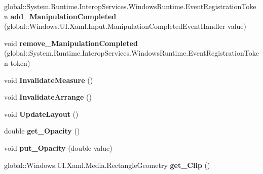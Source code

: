 \begin{DoxyCompactItemize}
global\+::\+System.\+Runtime.\+Interop\+Services.\+Windows\+Runtime.\+Event\+Registration\+Token {\bfseries add\+\_\+\+Manipulation\+Completed} (global\+::\+Windows.\+U\+I.\+Xaml.\+Input.\+Manipulation\+Completed\+Event\+Handler value)
\item 
\mbox{\label{interface_windows_1_1_u_i_1_1_xaml_1_1_i_u_i_element_a2e0443d9216898f5abc1ba06ac3d0404}} 
void {\bfseries remove\+\_\+\+Manipulation\+Completed} (global\+::\+System.\+Runtime.\+Interop\+Services.\+Windows\+Runtime.\+Event\+Registration\+Token token)
\item 
\mbox{\label{interface_windows_1_1_u_i_1_1_xaml_1_1_i_u_i_element_aac9b9aec43687960735502a35820466d}} 
void {\bfseries Invalidate\+Measure} ()
\item 
\mbox{\label{interface_windows_1_1_u_i_1_1_xaml_1_1_i_u_i_element_aac9b7aa8b7e9841562d377013cf574d7}} 
void {\bfseries Invalidate\+Arrange} ()
\item 
\mbox{\label{interface_windows_1_1_u_i_1_1_xaml_1_1_i_u_i_element_af7acd3e9383678b8386d4a908b7037ea}} 
void {\bfseries Update\+Layout} ()
\item 
\mbox{\label{interface_windows_1_1_u_i_1_1_xaml_1_1_i_u_i_element_ac73e763417220d829b8a2b5951828438}} 
double {\bfseries get\+\_\+\+Opacity} ()
\item 
\mbox{\label{interface_windows_1_1_u_i_1_1_xaml_1_1_i_u_i_element_a12fcaa6862ab54ca2e8c1537879d0fd8}} 
void {\bfseries put\+\_\+\+Opacity} (double value)
\item 
\mbox{\label{interface_windows_1_1_u_i_1_1_xaml_1_1_i_u_i_element_a3ac32c6dc006288e8edab536fce2cba9}} 
global\+::\+Windows.\+U\+I.\+Xaml.\+Media.\+Rectangle\+Geometry {\bfseries get\+\_\+\+Clip} ()
\item 
\mbox{\label{interface_windows_1_1_u_i_1_1_xaml_1_1_i_u_i_element_afa52f92cfbfffd55b51a14f0f3174ebb}} 

\end{DoxyCompactItemize}
